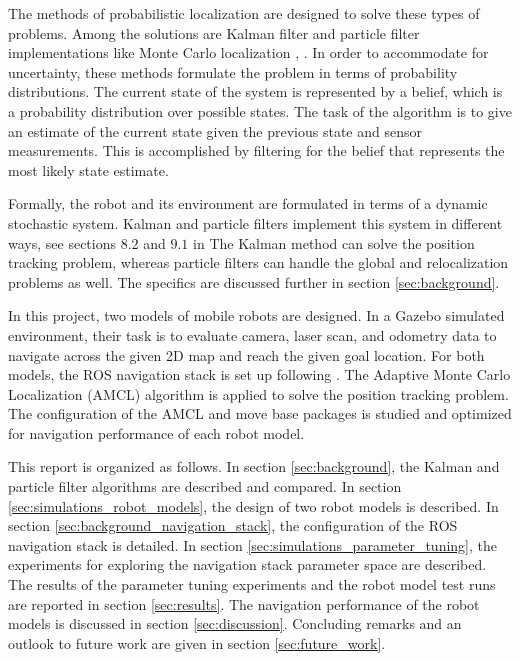 \documentclass[10pt,journal,compsoc]{IEEEtran}
\begin{document}
The methods of probabilistic localization are designed to solve these types of problems. Among the solutions are Kalman filter and particle filter implementations like Monte Carlo localization \cite{principles_of_robot_motion}, \cite{probabilistic_robotics}. In order to accommodate for uncertainty, these methods formulate the problem in terms of probability distributions. The current state of the system is represented by a belief, which is a probability distribution over possible states. The task of the algorithm is to give an estimate of the current state given the previous state and sensor measurements. This is accomplished by filtering for the belief that represents the most likely state estimate.

Formally, the robot and its environment are formulated in terms of a dynamic stochastic system. Kalman and particle filters implement this system in different ways, see sections $8.2$ and $9.1$ in \cite{principles_of_robot_motion} The Kalman method can solve the position tracking problem, whereas particle filters can handle the global and relocalization problems as well. The specifics are discussed further in section \ref{sec:background}. 

In this project, two models of mobile robots are designed. In a Gazebo simulated environment, their task is to evaluate camera, laser scan, and odometry data to navigate across the given 2D map and reach the given goal location. For both models, the ROS navigation stack is set up following \cite{ros_wiki_nav_stack}. The Adaptive Monte Carlo Localization (AMCL) algorithm is applied to solve the position tracking problem. The configuration of the AMCL and move base packages is studied and optimized for navigation performance of each robot model. 

This report is organized as follows. In section \ref{sec:background}, the Kalman and particle filter algorithms are described and compared. In section \ref{sec:simulations_robot_models}, the design of two robot models is described. In section \ref{sec:background_navigation_stack}, the configuration of the ROS navigation stack is detailed. In section \ref{sec:simulations_parameter_tuning}, the experiments for exploring the navigation stack parameter space are described. The results of the parameter tuning experiments and the robot model test runs are reported in section \ref{sec:results}. The navigation performance of the robot models is discussed in section \ref{sec:discussion}. Concluding remarks and an outlook to future work are given in section \ref{sec:future_work}. 
\end{document}
